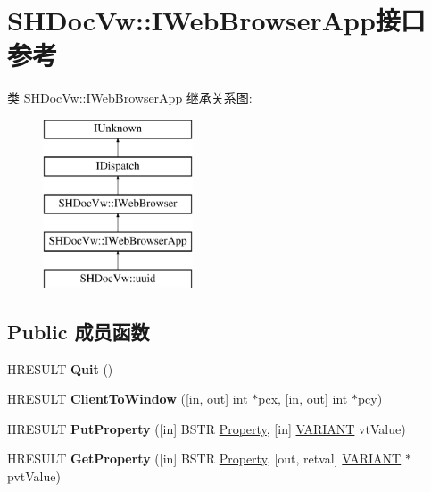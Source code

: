 \hypertarget{interface_s_h_doc_vw_1_1_i_web_browser_app}{}\section{S\+H\+Doc\+Vw\+:\+:I\+Web\+Browser\+App接口 参考}
\label{interface_s_h_doc_vw_1_1_i_web_browser_app}
类 S\+H\+Doc\+Vw\+:\+:I\+Web\+Browser\+App 继承关系图\+:\begin{figure}[H]
\begin{center}
\leavevmode
\includegraphics[height=5.000000cm]{interface_s_h_doc_vw_1_1_i_web_browser_app}
\end{center}
\end{figure}
\subsection*{Public 成员函数}
\begin{DoxyCompactItemize}
\item 
\mbox{\label{interface_s_h_doc_vw_1_1_i_web_browser_app_a5d2ee553b28ae957c180eaf6aa51b77e}} 
H\+R\+E\+S\+U\+LT {\bfseries Quit} ()
\item 
\mbox{\label{interface_s_h_doc_vw_1_1_i_web_browser_app_afaabcdc32784154a07534ac0dd138190}} 
H\+R\+E\+S\+U\+LT {\bfseries Client\+To\+Window} (\mbox{[}in, out\mbox{]} int $\ast$pcx, \mbox{[}in, out\mbox{]} int $\ast$pcy)
\item 
\mbox{\label{interface_s_h_doc_vw_1_1_i_web_browser_app_a8ea059498a21a64db34c2254f8840b3c}} 
H\+R\+E\+S\+U\+LT {\bfseries Put\+Property} (\mbox{[}in\mbox{]} B\+S\+TR \hyperlink{struct_property}{Property}, \mbox{[}in\mbox{]} \hyperlink{structtag_v_a_r_i_a_n_t}{V\+A\+R\+I\+A\+NT} vt\+Value)
\item 
\mbox{\label{interface_s_h_doc_vw_1_1_i_web_browser_app_af03a089cd9c48885ec1939bdbdb2bfcb}} 
H\+R\+E\+S\+U\+LT {\bfseries Get\+Property} (\mbox{[}in\mbox{]} B\+S\+TR \hyperlink{struct_property}{Property}, \mbox{[}out, retval\mbox{]} \hyperlink{structtag_v_a_r_i_a_n_t}{V\+A\+R\+I\+A\+NT} $\ast$pvt\+Value)
\end{DoxyCompactItemize}

